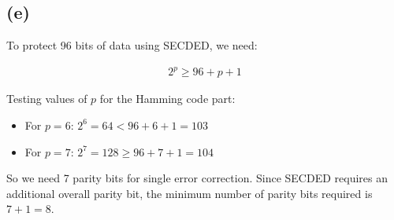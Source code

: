 \documentclass[12pt]{article}
\begin{document}
\subsection*{(e)}

To protect 96 bits of data using SECDED, we need:

\begin{align*}
    2^p \geq 96 + p + 1
\end{align*}

Testing values of $p$ for the Hamming code part:

\begin{itemize}
    \item For $p = 6$: $2^6 = 64 < 96 + 6 + 1 = 103$
    \item For $p = 7$: $2^7 = 128 \geq 96 + 7 + 1 = 104$
\end{itemize}

So we need 7 parity bits for single error correction. Since SECDED requires an additional overall parity bit, the minimum number of parity bits required is $7 + 1 = 8$.
\end{document}
